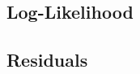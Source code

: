 \documentclass{article} %
\begin{document}
\subsection{Log-Likelihood}


%    


\subsection{Residuals}


\end{document}
